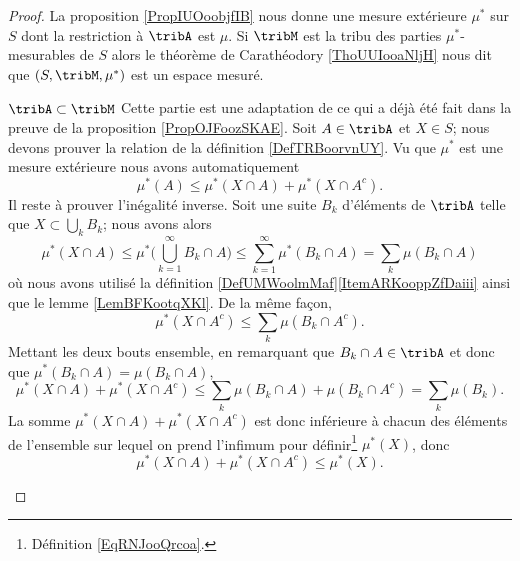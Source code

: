 \begin{proof}
    La proposition \ref{PropIUOoobjfIB} nous donne une mesure extérieure \( \mu^*\) sur \( S\) dont la restriction à \( \tribA\) est \( \mu\). Si \( \tribM\) est la tribu des parties \( \mu^*\)-mesurables de \( S\) alors le théorème de Carathéodory \ref{ThoUUIooaNljH} nous dit que \( (S,\tribM,\mu^*)\) est un espace mesuré.
    \begin{subproof}
        \item[\( \tribA\subset\tribM\)]
            Cette partie est une adaptation de ce qui a déjà été fait dans la preuve de la proposition \ref{PropOJFoozSKAE}. Soit \( A\in\tribA\) et \( X\in S\); nous devons prouver la relation de la définition \ref{DefTRBoorvnUY}. Vu que \( \mu^*\) est une mesure extérieure nous avons automatiquement
            \begin{equation}
                \mu^*(A)\leq \mu^*(X\cap A)+\mu^*(X\cap A^c).
            \end{equation}
            Il reste à prouver l'inégalité inverse. Soit une suite \( B_k\) d'éléments de \( \tribA\) telle que \( X\subset\bigcup_kB_k\); nous avons alors
            \begin{equation}
                \mu^*(X\cap A)\leq \mu^*\big( \bigcup_{k=1}^{\infty}B_k\cap A \big)\leq \sum_{k=1}^{\infty}\mu^*(B_k\cap A)=\sum_k\mu(B_k\cap A)
            \end{equation}
            où nous avons utilisé la définition \ref{DefUMWoolmMaf}\ref{ItemARKooppZfDaiii} ainsi que le lemme \ref{LemBFKootqXKl}. De la même façon,
            \begin{equation}
                \mu^*(X\cap A^c)\leq \sum_k\mu(B_k\cap A^c).
            \end{equation}
            Mettant les deux bouts ensemble, en remarquant que \( B_k\cap A\in\tribA\) et donc que \( \mu^*(B_k\cap A)=\mu(B_k\cap A)\),
            \begin{equation}
                \mu^*(X\cap A)+\mu^*(X\cap A^c)\leq \sum_k\mu(B_k\cap A)+\mu(B_k\cap A^c)=\sum_k\mu(B_k).
            \end{equation}
            La somme \( \mu^*(X\cap A)+\mu^*(X\cap A^c)\) est donc inférieure à chacun des éléments de l'ensemble sur lequel on prend l'infimum pour définir\footnote{Définition \ref{EqRNJooQrcoa}.} \( \mu^*(X)\), donc
            \begin{equation}
                 \mu^*(X\cap A)+\mu^*(X\cap A^c)\leq \mu^*(X).
            \end{equation}
    \end{subproof}


\end{proof}
